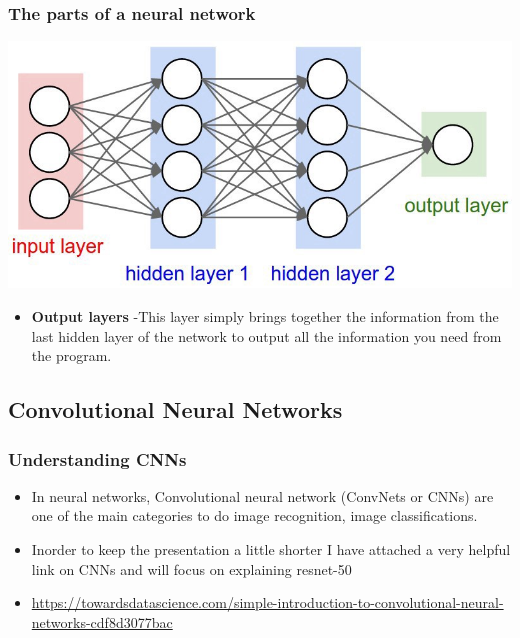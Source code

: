 \documentclass{beamer}
\begin{document}
\begin{frame}
\frametitle{The parts of a neural network}
\centering
\includegraphics[scale=0.2]{partsnn.jpeg}
\begin{itemize}
   
   \item \textbf{Output layers} -This layer simply brings together the information from the last hidden layer of the network to output all the information you need from the program.
   
  
   
\end{itemize}

\end{frame}


\subsection{Convolutional Neural Networks}
\begin{frame}
\frametitle{Understanding CNNs}

\begin{itemize}
   
   \item In neural networks, Convolutional neural network (ConvNets or CNNs) are one of the main categories to do image recognition, image classifications. 
   \item Inorder to keep the presentation a little shorter I have attached a very helpful link on CNNs and will focus on explaining resnet-50
   
   \item \url{https://towardsdatascience.com/simple-introduction-to-convolutional-neural-networks-cdf8d3077bac}
   
  
   
\end{itemize}

\end{frame}
\end{document}
